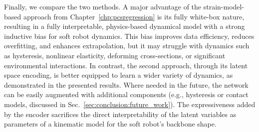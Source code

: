 Finally, we compare the two methods. A major advantage of the strain-model-based approach from Chapter~\ref{chp:pcsregression} is its fully white-box nature, resulting in a fully interpretable, physics-based dynamical model with a strong inductive bias for soft robot dynamics. This bias improves data efficiency, reduces overfitting, and enhances extrapolation, but it may struggle with dynamics such as hysteresis, nonlinear elasticity, deforming cross-sections, or significant environmental interactions. In contrast, the second approach, through its latent space encoding, is better equipped to learn a wider variety of dynamics, as demonstrated in the presented results. Where needed in the future, the network can be easily augmented with additional components (e.g., hysteresis or contact models, discussed in Sec.~\ref{sec:conclusion:future_work}). The expressiveness added by the encoder sacrifices the direct interpretability of the latent variables as parameters of a kinematic model for the soft robot’s backbone shape.

